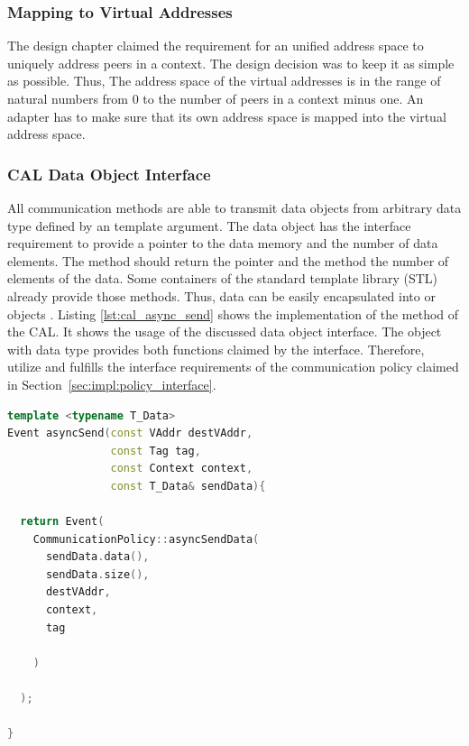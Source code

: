 \subsubsection{Mapping to Virtual Addresses}
The design chapter claimed the requirement for an unified address
space to uniquely address peers in a context. The design decision
was to keep it as simple as possible. Thus, The address space of the
virtual addresses is in the range of natural numbers from 0 to the number
of peers in a context minus one. An adapter has to make sure that its own address
space is mapped into the virtual address space.

\subsubsection{CAL Data Object Interface}
All communication methods are able to transmit data objects from
arbitrary data type defined by an template argument. The data object
has the interface requirement to provide a pointer to the data memory
and the number of data elements.  The method  should
return the pointer and the method  the number of elements
of the data. Some containers of the standard template library (STL)
already provide those methods. Thus, data can be easily encapsulated
into  or  objects \cite{ref:vector,
  ref:array}. Listing \ref{lst:cal_async_send} shows the
implementation of the  method of the CAL. It shows the
usage of the discussed data object interface.  The object
 with data type  provides both functions
claimed by the interface. Therefore, utilize  and
 fulfills the interface requirements of the
communication policy claimed in
Section~\ref{sec:impl:policy_interface}.

\begin{lstlisting}[language=C++, breaklines=false, label={lst:cal_async_send}]
template <typename T_Data>
Event asyncSend(const VAddr destVAddr, 
                const Tag tag, 
                const Context context, 
                const T_Data& sendData){

  return Event(
    CommunicationPolicy::asyncSendData(
      sendData.data(),
      sendData.size(), 
      destVAddr, 
      context, 
      tag
      
    )
      
  );

}
\end{lstlisting}

